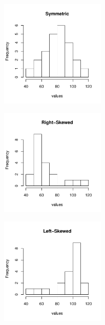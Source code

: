 \documentclass[11pt, chapterprefix=true]{scrbook}\usepackage[]{graphicx}\usepackage[]{color}
\begin{document}
\begin{minipage}[ht]{5cm}



{\centering \includegraphics[width=5cm]{figure/LBL2m-1} 

}



\end{minipage}
\begin{minipage}[ht]{5cm}



{\centering \includegraphics[width=5cm]{figure/LBL2n-1} 

}



\end{minipage}
\begin{minipage}[ht]{5cm}



{\centering \includegraphics[width=5cm]{figure/LBL2o-1} 

}



\end{minipage}
\end{document}
